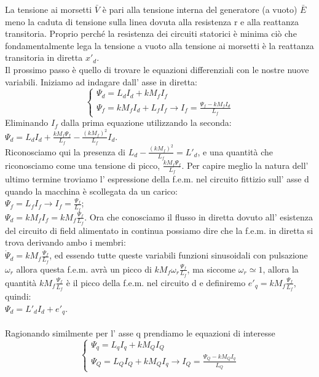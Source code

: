 \documentclass[Lau,noexaminfo]{sapthesis}
\begin{document}
	La tensione ai morsetti $\bar{V}$ è pari alla tensione interna del generatore (a vuoto) $\bar{E}$ meno la caduta di tensione sulla linea dovuta alla resistenza r e alla reattanza transitoria. Proprio perché la resistenza dei circuiti statorici è minima ciò che fondamentalmente lega la tensione a vuoto alla tensione ai morsetti è la reattanza transitoria in diretta $x'_d$.\\
	Il prossimo passo è quello di trovare le equazioni differenziali con le nostre nuove variabili. Iniziamo ad indagare dall' asse in diretta:\\
	\[
	\begin{cases}
	\Psi_d=L_dI_d+kM_fI_f\\
	\Psi_f=kM_fI_d+L_fI_f \rightarrow I_f=\frac{\Psi_f-kM_fI_d}{L_f}
	\end{cases}
	\]
	Eliminando $I_f$ dalla prima equazione utilizzando la seconda:\\
	$\Psi_d=L_dI_d+\frac{kM_f\Psi_f}{L_f}-\frac{(kM_f)^2}{L_f}I_d$.\\
	Riconosciamo qui la presenza di $L_d-\frac{(kM_f)^2}{L_f}=L'_d$, e una quantità che riconosciamo come una tensione di picco, $\frac{kM_f\Psi_f}{L_f}$. Per capire meglio la natura dell' ultimo termine troviamo l' espressione della f.e.m. nel circuito fittizio sull' asse d quando la macchina è scollegata da un carico:\\
	$\Psi_f=L_fI_f \rightarrow I_f=\frac{\Psi_f}{L_f}$;\\
	$\Psi_d=kM_fI_f=kM_f\frac{\Psi_f}{L_f}$. Ora che conosciamo il flusso in diretta dovuto all' esistenza del circuito di field alimentato in continua possiamo dire che la f.e.m. in diretta si trova derivando ambo i membri:\\
	$\dot{\Psi}_d=kM_f\frac{\dot{\Psi}_f}{L_f}$, ed essendo tutte queste variabili funzioni sinusoidali con pulsazione $\omega_r$ allora questa f.e.m. avrà un picco di $kM_f\omega_r\frac{\Psi_f}{L_f}$, ma siccome $\omega_r\simeq1$, allora la quantità $kM_f\frac{\Psi_f}{L_f}$ è il picco della f.e.m. nel circuito d e definiremo $e'_q=kM_f\frac{\Psi_f}{L_f}$, quindi:\\
	$\Psi_d=L'_dI_d+e'_q$.\\\\
	Ragionando similmente per l' asse q prendiamo le equazioni di interesse\\
	\[
	\begin{cases}
	\Psi_q=L_qI_q+kM_QI_Q\\
	\Psi_Q=L_QI_Q+kM_QI_q \rightarrow I_Q=\frac{\Psi_Q-kM_QI_q}{L_Q}
	\end{cases}
	\]
\end{document}
